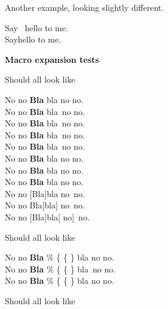 \documentclass[12pt]{article}
\begin{document}
{Another example, looking slightly different.

Say \ hello to me.\\
Say\xf{}hello to me.


\begin{lcHtmlBlock}
{\bf Macro expansion tests}

Should all look like

No no \textbf{Bla} bla no no.\\
%
\newcommand{\macro}{\textbf{Bla} bla}
No no \macro\ no no.\\
%
\def\macroa{\textbf{Bla} bla}
No no \macroa\ no no.\\
%
\newcommand{\macrob} %

  {\textbf{Bla}  bla}
%
No no \macrob\ no no.\\
%
\newcommand{\macroc}{\textbf{Bla} %
  bla}
%
No no \macroc\ no no.\\
%
\newcommand{\a}[1]{\textbf{#1} bla}
%
No no \a{Bla} no no.\\
%
\def\aa #1{\textbf{#1} bla}
%
No no \aa{Bla} no no.\\
%
\def\aaa #1#2#3{\textbf{#3#2#1} bla}
%
No no \aaa alB no no.\\
%
\newcommand{\b}[1]{ #1}
\newcommand{\b@om}{\textbf{#1} #2}
%
No no \b[Bla]{bla}\b{no}\ no.\\
%
\newcommand{\bb}[1]{ #1}
\newcommand{\bb@mo}{\textbf{#1} #2}
%
No no \bb{Bla}[bla]\bb{no}\ no.\\
%
\newcommand{\bb@omo}{\textbf{#1} #2#3}
No no \bb[Bla]{bla}[ no]\ no.


Should all look like

No no \textbf{Bla} \% \{ \{ \} bla no no.\\
%
\newcommand{\macrod}{\textbf{Bla} \% \{ \{ \} bla}
No no \macrod\ no no.\\
%
\newcommand{\|}{\textbf{Bla} \% \{ \{ \} bla}
%
No no \| no no.

Should all look like


\end{lcHtmlBlock}}
\end{document}
